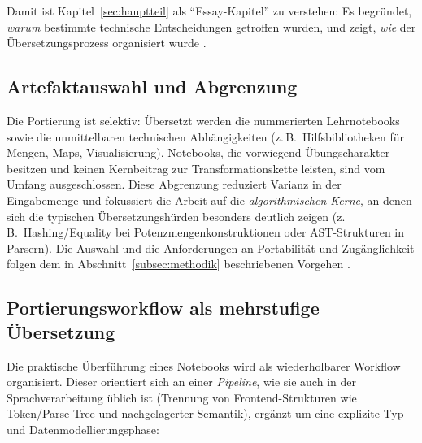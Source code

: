 Damit ist Kapitel~\ref{sec:hauptteil} als \enquote{Essay-Kapitel} zu verstehen: Es begründet, \emph{warum} bestimmte technische Entscheidungen getroffen wurden, und zeigt, \emph{wie} der Übersetzungsprozess organisiert wurde \autocite[S.~14]{aho2006compilers}.

\subsection{Artefaktauswahl und Abgrenzung}
\label{subsec:methodik_scope}

Die Portierung ist selektiv: Übersetzt werden die nummerierten Lehrnotebooks sowie die unmittelbaren technischen Abhängigkeiten (z.\,B.\ Hilfsbibliotheken für Mengen, Maps, Visualisierung). Notebooks, die vorwiegend Übungscharakter besitzen und keinen Kernbeitrag zur Transformationskette leisten, sind vom Umfang ausgeschlossen. Diese Abgrenzung reduziert Varianz in der Eingabemenge und fokussiert die Arbeit auf die \emph{algorithmischen Kerne}, an denen sich die typischen Übersetzungshürden besonders deutlich zeigen (z.\,B.\ Hashing/Equality bei Potenzmengenkonstruktionen oder AST-Strukturen in Parsern). Die Auswahl und die Anforderungen an Portabilität und Zugänglichkeit folgen dem in Abschnitt~\ref{subsec:methodik} beschriebenen Vorgehen \autocite[S.~14]{aho2006compilers}.

\subsection{Portierungsworkflow als mehrstufige Übersetzung}
\label{subsec:methodik_workflow}

Die praktische Überführung eines Notebooks wird als wiederholbarer Workflow organisiert. Dieser orientiert sich an einer \emph{Pipeline}, wie sie auch in der Sprachverarbeitung üblich ist (Trennung von Frontend-Strukturen wie Token/Parse Tree und nachgelagerter Semantik), ergänzt um eine explizite Typ- und Datenmodellierungsphase:

